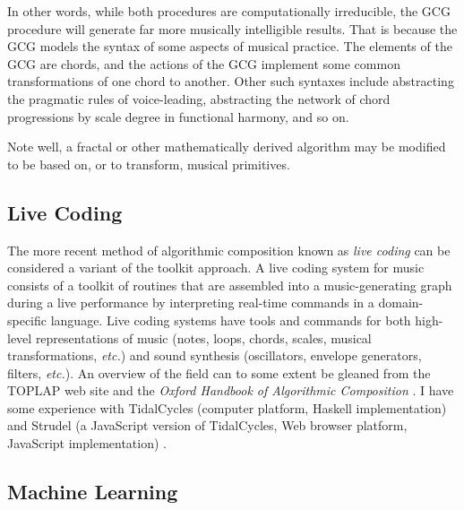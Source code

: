 \documentclass[11pt]{scrartcl}
\begin{document}
In other words, while both procedures are computationally irreducible, the GCG procedure will generate far more musically intelligible results. That is because the GCG models the syntax of some aspects of musical practice. The elements of the GCG are chords, and the actions of the GCG implement some common transformations of one chord to another. Other such syntaxes include abstracting the pragmatic rules of voice-leading, abstracting the network of chord progressions by scale degree in functional harmony, and so on.

Note well, a fractal or other mathematically derived algorithm may be modified to be based on, or to transform, musical primitives.

\subsection*{Live Coding}

The more recent method of algorithmic composition known as \emph{live coding} can be considered a variant of the toolkit approach. A live coding system for music consists of a toolkit of routines that are assembled into a music-generating graph during a live performance by interpreting real-time commands in a domain-specific language. Live coding systems have tools and commands for both high-level representations of music (notes, loops, chords, scales, musical transformations, \emph{etc.}) and sound synthesis (oscillators, envelope generators, filters, \emph{etc.}). An overview of the field can to some extent be gleaned from the TOPLAP web site \parencite{toplap} and the \emph{Oxford Handbook of Algorithmic Composition} \parencite{mclean2018oxford}. I have some experience with TidalCycles (computer platform, Haskell implementation) \parencite{tidalcycles} and Strudel (a JavaScript version of TidalCycles, Web browser platform, JavaScript implementation) \parencite{strudel}.

\subsection*{Machine Learning}
\end{document}
